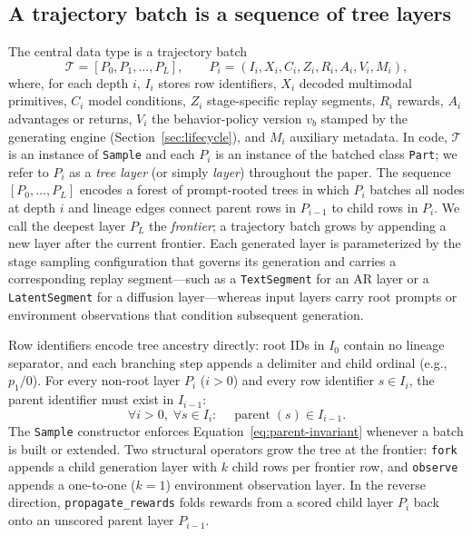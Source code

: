 \documentclass[10pt]{article}
\newcommand{\sample}{\texttt{Sample}}
\newcommand{\parttype}{\texttt{Part}}
\begin{document}
\subsection{A trajectory batch is a sequence of tree layers}
\label{sec:trajectory-layers}

The central data type is a trajectory batch
\begin{equation}
\mathcal{T} = [P_0,P_1,\ldots,P_L],
\qquad
P_i = (I_i, X_i, C_i, Z_i, R_i, A_i, V_i, M_i),
\label{eq:sample}
\end{equation}
where, for each depth $i$, $I_i$ stores row identifiers, $X_i$ decoded multimodal primitives, $C_i$ model conditions, $Z_i$ stage-specific replay segments, $R_i$ rewards, $A_i$ advantages or returns, $V_i$ the behavior-policy version $v_b$ stamped by the generating engine (Section~\ref{sec:lifecycle}), and $M_i$ auxiliary metadata.
In code, $\mathcal{T}$ is an instance of \sample{} and each $P_i$ is an instance of the batched class \parttype{}; we refer to $P_i$ as a \emph{tree layer} (or simply \emph{layer}) throughout the paper.
The sequence $[P_0,\ldots,P_L]$ encodes a forest of prompt-rooted trees in which $P_i$ batches all nodes at depth $i$ and lineage edges connect parent rows in $P_{i-1}$ to child rows in $P_i$.
We call the deepest layer $P_L$ the \emph{frontier}; a trajectory batch grows by appending a new layer after the current frontier.
Each generated layer is parameterized by the stage sampling configuration that governs its generation and carries a corresponding replay segment---such as a \texttt{TextSegment} for an AR layer or a \texttt{LatentSegment} for a diffusion layer---whereas input layers carry root prompts or environment observations that condition subsequent generation.

Row identifiers encode tree ancestry directly: root IDs in $I_0$ contain no lineage separator, and each branching step appends a delimiter and child ordinal (e.g., $p_1/0$).
For every non-root layer $P_i$ ($i>0$) and every row identifier $s\in I_i$, the parent identifier must exist in $I_{i-1}$:
\begin{equation}
\forall i>0,\;\forall s\in I_i:\quad \operatorname{parent}(s)\in I_{i-1}.
\label{eq:parent-invariant}
\end{equation}
The \sample{} constructor enforces Equation~\ref{eq:parent-invariant} whenever a batch is built or extended.
Two structural operators grow the tree at the frontier: \texttt{fork} appends a child generation layer with $k$ child rows per frontier row, and \texttt{observe} appends a one-to-one ($k=1$) environment observation layer.
In the reverse direction, \texttt{propagate\_rewards} folds rewards from a scored child layer $P_i$ back onto an unscored parent layer $P_{i-1}$.
\end{document}
